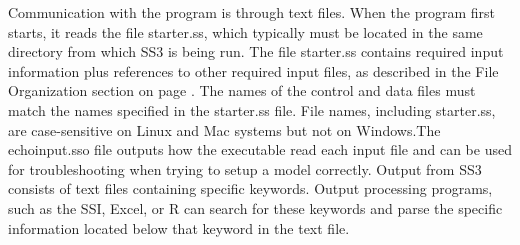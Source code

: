 Communication with the program is through text files. When the program first starts, it reads the file starter.ss, which typically must be located in the same directory from which SS3 is being run. The file starter.ss contains required input information plus references to other required input files, as described in the File Organization section on page \pageref{FileOrganization}. The names of the control and data files must match the names specified in the starter.ss file. File names, including starter.ss, are case-sensitive on Linux and Mac systems but not on Windows.The echoinput.sso file outputs how the executable read each input file and can be used for troubleshooting when trying to setup a model correctly. Output from SS3 consists of text files containing specific keywords. Output processing programs, such as the SSI, Excel, or R can search for these keywords and parse the specific information located below that keyword in the text file.

\pagebreak
